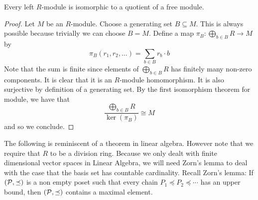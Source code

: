 \documentclass[a4paper]{article}
\begin{document}
\begin{lmm}{}{} Every left $R$-module is isomorphic to a quotient of a free module. \tcbline
\begin{proof}
Let $M$ be an $R$-module. Choose a generating set $B\subseteq M$. This is always possible because trivially we can choose $B=M$. Define a map $\pi_B:\bigoplus_{b\in B}R\to M$ by $$\pi_B(r_1,r_2,\dots)=\sum_{b\in B}r_b\cdot b$$ Note that the sum is finite since elements of $\bigoplus_{b\in B}R$ has finitely many non-zero components. It is clear that it is an $R$-module homomorphism. It is also surjective by definition of a generating set. By the first isomorphism theorem for module, we have that $$\frac{\bigoplus_{b\in B}R}{\ker(\pi_B)}\cong M$$ and so we conclude. 
\end{proof}
\end{lmm}

The following is reminiscent of a theorem in linear algebra. However note that we require that $R$ to be a division ring. Because we only dealt with finite dimensional vector spaces in Linear Algebra, we will need Zorn's lemma to deal with the case that the basis set has countable cardinality. Recall Zorn's lemma: If $(\mathcal{P},\preceq)$ is a non empty poset such that every chain $P_1\preceq P_2\preceq\cdots$ has an upper bound, then $(\mathcal{P},\preceq)$ contains a maximal element. 
\end{document}
